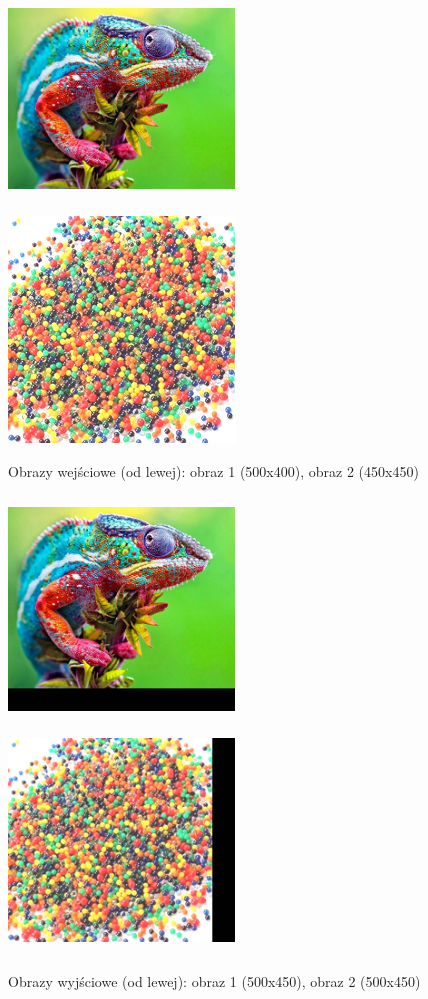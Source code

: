 \documentclass[magisterska,openany]{pracadypl}
\begin{document}
\newpage
\begin{figure}[h]
\centering
\includegraphics[width=6cm, height=6cm]{orgi/RGBkamel.jpg}
\includegraphics[width=6cm, height=6cm]{orgi/RGBkulki.jpg}
\caption{Obrazy wejściowe (od lewej): obraz 1 (500x400), obraz 2 (450x450) }
\end{figure}
\begin{figure}[h]
\centering
\includegraphics[width=6cm, height=6cm]{2_3/GeoRGB3.jpg}
\includegraphics[width=6cm, height=6cm]{2_3/GeoRGB4.jpg}
\caption{Obrazy wyjściowe (od lewej): obraz 1 (500x450), obraz 2 (500x450) }
\end{figure}
\end{document}
